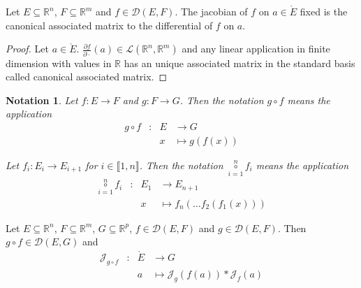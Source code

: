 \documentclass[11pt,en]{elegantpaper}
\newtheorem{notation}{Notation}
\begin{document}
\begin{corollary}
  {\normalfont Let $E \subseteq \mathbb{R}^n$, $F \subseteq \mathbb{R}^m$ and $f \in \mathcal{D}(E,F)$.
  The jacobian of $f$ on $a \in \mathring{E}$ fixed is the canonical associated matrix to the differential of $f$ on $a$.} \par
   \par
\end{corollary}

\begin{proof}
  Let $a \in \mathring{E}$.
  $\frac{\partial f}{\partial \cdot}(a) \in \mathcal{L}(\mathbb{R}^n,\mathbb{R}^m)$ and any linear application in finite dimension
  with values in $\mathbb{R}$ has an unique associated matrix in the standard basis called canonical associated matrix. \par
\end{proof}

\begin{notation}
  Let $f : E \longrightarrow F$ and $g : F \longrightarrow G$.
  Then the notation $g \circ f$ means the application \begin{equation*}
    \begin{array}{llll}
      g \circ f & : & E & \longrightarrow G \\
        &   & x & \longmapsto g(f(x))
    \end{array}
  \end{equation*} \par

  Let $f_i : E_i \longrightarrow E_{i+1}$ for $i \in \llbracket 1,n \rrbracket$.
  Then the notation $\underset{i=1}{\overset{n}\circ} f_i$ means the application \begin{equation*}
    \begin{array}{llll}
      \underset{i=1}{\overset{n}\circ} f_i & : & E_1 & \longrightarrow E_{n+1} \\
        &   & x & \longmapsto f_n( \ldots f_2(f_1(x)))
    \end{array}
  \end{equation*}
\end{notation}

\begin{theorem}
  {\normalfont Let $E \subseteq \mathbb{R}^n$, $F \subseteq \mathbb{R}^m$, $G \subseteq \mathbb{R}^p$, $f \in \mathcal{D}(E,F)$ and $g \in \mathcal{D}(E,F)$.
  Then $g \circ f \in \mathcal{D}(E,G)$ and} \begin{equation}
    \begin{array}{llll}
      \mathcal{J}_{g \circ f} & : & \mathring{E} & \longrightarrow G \\
      &   & a & \longmapsto \mathcal{J}_{g}(f(a)) * \mathcal{J}_{f}(a)
    \end{array}
  \end{equation}
\end{theorem}
\end{document}
